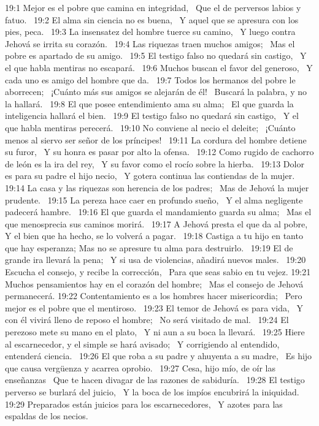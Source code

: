 19:1 Mejor es el pobre que camina en integridad,  
Que el de perversos labios y fatuo.  
19:2 El alma sin ciencia no es buena,  
Y aquel que se apresura con los pies, peca.  
19:3 La insensatez del hombre tuerce su camino,  
Y luego contra Jehová se irrita su corazón.  
19:4 Las riquezas traen muchos amigos;  
Mas el pobre es apartado de su amigo.  
19:5 El testigo falso no quedará sin castigo,  
Y el que habla mentiras no escapará.  
19:6 Muchos buscan el favor del generoso,  
Y cada uno es amigo del hombre que da.  
19:7 Todos los hermanos del pobre le aborrecen;  
¡Cuánto más sus amigos se alejarán de él!  
Buscará la palabra, y no la hallará.  
19:8 El que posee entendimiento ama su alma;  
El que guarda la inteligencia hallará el bien.  
19:9 El testigo falso no quedará sin castigo,  
Y el que habla mentiras perecerá.  
19:10 No conviene al necio el deleite;  
¡Cuánto menos al siervo ser señor de los príncipes!  
19:11 La cordura del hombre detiene su furor,  
Y su honra es pasar por alto la ofensa.  
19:12 Como rugido de cachorro de león es la ira del rey,  
Y su favor como el rocío sobre la hierba.  
19:13 Dolor es para su padre el hijo necio,  
Y gotera continua las contiendas de la mujer.  
19:14 La casa y las riquezas son herencia de los padres;  
Mas de Jehová la mujer prudente.  
19:15 La pereza hace caer en profundo sueño,  
Y el alma negligente padecerá hambre.  
19:16 El que guarda el mandamiento guarda su alma;  
Mas el que menosprecia sus caminos morirá.  
19:17 A Jehová presta el que da al pobre,  
Y el bien que ha hecho, se lo volverá a pagar.  
19:18 Castiga a tu hijo en tanto que hay esperanza; 
Mas no se apresure tu alma para destruirlo.  
19:19 El de grande ira llevará la pena;  
Y si usa de violencias, añadirá nuevos males.  
19:20 Escucha el consejo, y recibe la corrección,  
Para que seas sabio en tu vejez. 
19:21 Muchos pensamientos hay en el corazón del hombre;  
Mas el consejo de Jehová permanecerá. 
19:22 Contentamiento es a los hombres hacer misericordia;  
Pero mejor es el pobre que el mentiroso.  
19:23 El temor de Jehová es para vida,  
Y con él vivirá lleno de reposo el hombre;  
No será visitado de mal.  
19:24 El perezoso mete su mano en el plato,  
Y ni aun a su boca la llevará.  
19:25 Hiere al escarnecedor, y el simple se hará avisado;  
Y corrigiendo al entendido, entenderá ciencia.  
19:26 El que roba a su padre y ahuyenta a su madre,  
Es hijo que causa vergüenza y acarrea oprobio.  
19:27 Cesa, hijo mío, de oír las enseñanzas  
Que te hacen divagar de las razones de sabiduría.  
19:28 El testigo perverso se burlará del juicio,  
Y la boca de los impíos encubrirá la iniquidad.  
19:29 Preparados están juicios para los escarnecedores,  
Y azotes para las espaldas de los necios.  
